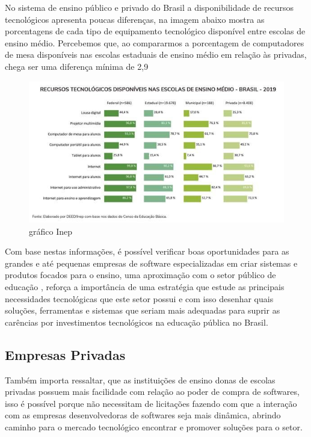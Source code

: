 \documentclass[
12pt,				%
oneside,			%
a4paper,			%
section=TITLE,
brazil,				%
]{abntex2}
\begin{document}
  No sistema de ensino público e privado do Brasil a disponibilidade de recursos
  tecnológicos apresenta poucas diferenças, na imagem abaixo mostra as
  porcentagens de cada tipo de equipamento tecnológico disponível entre escolas
  de ensino médio. Percebemos que, ao compararmos a porcentagem de computadores
  de mesa disponíveis nas escolas estaduais de ensino médio em relação às
  privadas, chega ser uma diferença mínima de 2,9%

  \begin{figure}[htb]
    \caption{\label{}gráfico Inep}
    \begin{center}
      \includegraphics[scale=3.45]{./img/inep-grafico.png}
    \end{center}
  \end{figure}


  Com base nestas informações, é possível verificar boas oportunidades para as
  grandes e até pequenas empresas de software especializadas em criar sistemas e
  produtos focados para o ensino, uma aproximação com o setor público de educação
, reforça a importância de uma estratégia que estude as principais necessidades
  tecnológicas que este setor possui e com isso desenhar quais soluções,
  ferramentas e sistemas que seriam mais adequadas para suprir as carências por
  investimentos tecnológicos na educação pública no Brasil.

  \subsection{Empresas Privadas}

  Também importa ressaltar, que as instituições de ensino donas de escolas
  privadas possuem mais facilidade com relação ao poder de compra de softwares,
  isso é possível porque não necessitam de licitações fazendo com que a interação
  com as empresas desenvolvedoras de softwares seja mais dinâmica, abrindo
  caminho para o mercado tecnológico encontrar e promover soluções para o setor.
\end{document}
